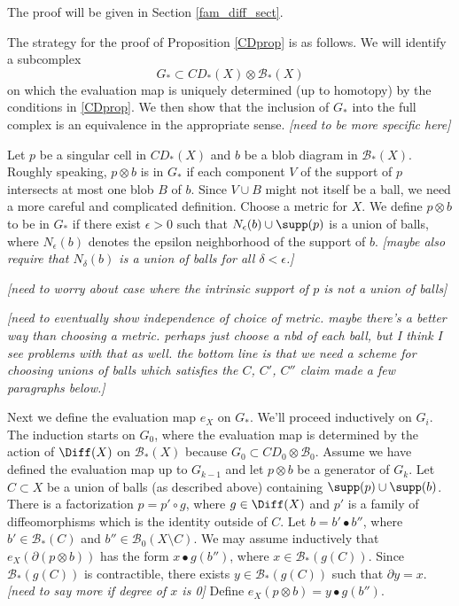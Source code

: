 \documentclass[11pt,leqno]{amsart}
\def\bc{{\mathcal B}}
\def\bd{\partial}
\def\sub{\subset}
\def\setmin{\setminus}
\def\nn#1{{{\it \small [#1]}}}
\begin{document}
The proof will be given in Section \ref{fam_diff_sect}.

\medskip

The strategy for the proof of Proposition \ref{CDprop} is as follows.
We will identify a subcomplex
\[
	G_* \sub CD_*(X) \otimes \bc_*(X)
\]
on which the evaluation map is uniquely determined (up to homotopy) by the conditions
in \ref{CDprop}.
We then show that the inclusion of $G_*$ into the full complex
is an equivalence in the appropriate sense.
\nn{need to be more specific here}

Let $p$ be a singular cell in $CD_*(X)$ and $b$ be a blob diagram in $\bc_*(X)$.
Roughly speaking, $p\otimes b$ is in $G_*$ if each component $V$ of the support of $p$ 
intersects at most one blob $B$ of $b$.
Since $V \cup B$ might not itself be a ball, we need a more careful and complicated definition.
Choose a metric for $X$.
We define $p\otimes b$ to be in $G_*$ if there exist $\epsilon > 0$ such that 
$N_\epsilon(b) \cup \supp(p)$ is a union of balls, where $N_\epsilon(b)$ denotes the epsilon
neighborhood of the support of $b$.
\nn{maybe also require that $N_\delta(b)$ is a union of balls for all $\delta<\epsilon$.}

\nn{need to worry about case where the intrinsic support of $p$ is not a union of balls}

\nn{need to eventually show independence of choice of metric.  maybe there's a better way than
choosing a metric.  perhaps just choose a nbd of each ball, but I think I see problems
with that as well.
the bottom line is that we need a scheme for choosing unions of balls
which satisfies the $C$, $C'$, $C''$ claim made a few paragraphs below.}

Next we define the evaluation map $e_X$ on $G_*$.
We'll proceed inductively on $G_i$.
The induction starts on $G_0$, where the evaluation map is determined
by the action of $\Diff(X)$ on $\bc_*(X)$
because $G_0 \sub CD_0\otimes \bc_0$.
Assume we have defined the evaluation map up to $G_{k-1}$ and
let $p\otimes b$ be a generator of $G_k$.
Let $C \sub X$ be a union of balls (as described above) containing $\supp(p)\cup\supp(b)$.
There is a factorization $p = p' \circ g$, where $g\in \Diff(X)$ and $p'$ is a family of diffeomorphisms which is the identity outside of $C$.
Let $b = b'\bullet b''$, where $b' \in \bc_*(C)$ and $b'' \in \bc_0(X\setmin C)$.
We may assume inductively that $e_X(\bd(p\otimes b))$ has the form $x\bullet g(b'')$, where
$x \in \bc_*(g(C))$.
Since $\bc_*(g(C))$ is contractible, there exists $y \in \bc_*(g(C))$ such that $\bd y = x$.
\nn{need to say more if degree of $x$ is 0}
Define $e_X(p\otimes b) = y\bullet g(b'')$.
\end{document}
